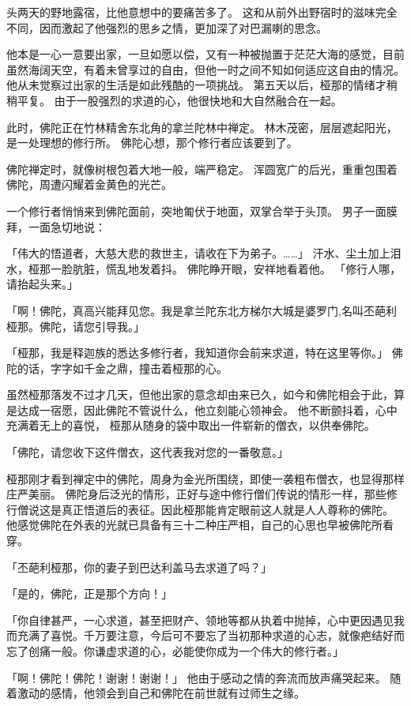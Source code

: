 \documentclass[twoside,openany]{book}
\begin{document}
头两天的野地露宿，比他意想中的要痛苦多了。
这和从前外出野宿时的滋味完全不同，因而激起了他强烈的思乡之情，更加深了对巴漏喇的思念。

他本是一心一意要出家，一旦如愿以偿，又有一种被抛置于茫茫大海的感觉，目前虽然海阔天空，有着未曾享过的自由，但他一时之间不知如何适应这自由的情况。
他从未觉察过出家的生活是如此残酷的一项挑战。
第五天以后，桠那的情绪才稍稍平复。
由于一股强烈的求道的心，他很快地和大自然融合在一起。

此时，佛陀正在竹林精舍东北角的拿兰陀林中禅定。
林木茂密，层层遮起阳光，是一处理想的修行所。
佛陀心想，那个修行者应该要到了。

佛陀禅定时，就像树根包着大地一般，端严稳定。
浑圆宽广的后光，重重包围着佛陀，周遭闪耀着金黄色的光芒。

一个修行者悄悄来到佛陀面前，突地匍伏于地面，双掌合举于头顶。
男子一面膜拜，一面急切地说：

「伟大的悟道者，大慈大悲的救世主，请收在下为弟子。……」
汗水、尘土加上泪水，桠那一脸肮脏，慌乱地发着抖。
佛陀睁开眼，安祥地看着他。
「修行人哪，请抬起头来。」

「啊！佛陀，真高兴能拜见您。我是拿兰陀东北方梯尔大城是婆罗门,名叫丕葩利\textperiodcentered 桠那。佛陀，请您引导我。」

「桠那，我是释迦族的悉达多修行者，我知道你会前来求道，特在这里等你。」
佛陀的话，字字如千金之鼎，撞击着桠那的心。

虽然桠那落发不过才几天，但他出家的意念却由来已久，如今和佛陀相会于此，算是达成一宿愿，因此佛陀不管说什么，他立刻能心领神会。
他不断颤抖着，心中充满着无上的喜悦，
桠那从随身的袋中取出一件崭新的僧衣，以供奉佛陀。

「佛陀，请您收下这件僧衣，这代表我对您的一番敬意。」

桠那刚才看到禅定中的佛陀，周身为金光所围绕，即使一袭粗布僧衣，也显得那样庄严美丽。
佛陀身后泛光的情形，正好与途中修行僧们传说的情形一样，那些修行僧说这是真正悟道后的表征。因此桠那能肯定眼前这人就是人人尊称的佛陀。
他感觉佛陀在外表的光就已具备有三十二种庄严相，自己的心思也早被佛陀所看穿。

「丕葩利\textperiodcentered 桠那，你的妻子到巴达利\textperiodcentered 盖马去求道了吗？」

「是的，佛陀，正是那个方向！」

「你自律甚严，一心求道，甚至把财产、领地等都从执着中抛掉，心中更因遇见我而充满了喜悦。千万要注意，今后可不要忘了当初那种求道的心志，就像疤结好而忘了创痛一般。你谦虚求道的心，必能使你成为一个伟大的修行者。」

「啊！佛陀！佛陀！谢谢！谢谢！」
他由于感动之情的奔流而放声痛哭起来。
随着激动的感情，他领会到自己和佛陀在前世就有过师生之缘。
\end{document}
